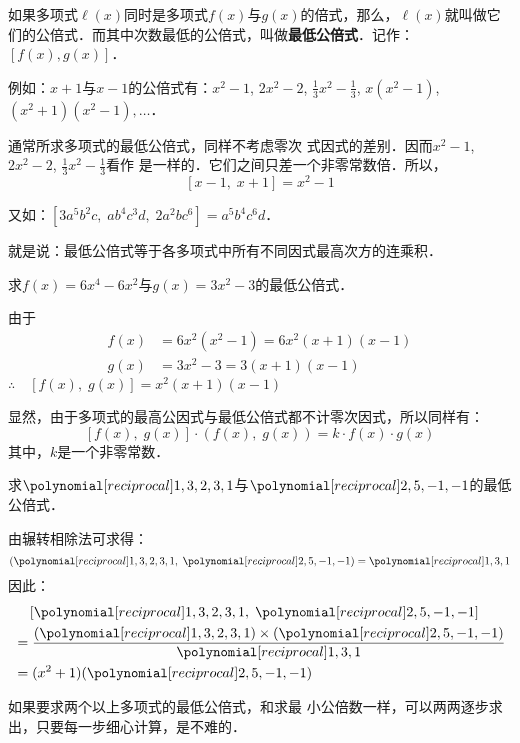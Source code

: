如果多项式$\ell(x)$同时是多项式$f(x)$与$g(x)$的倍式，那么，$\ell(x)$就叫做它们的公倍式．而其中次数最低的公倍式，叫做\textbf{最低公倍式}．记作：$[f(x),g(x)]$．

例如：$x+1$与$x-1$的公倍式有：$x^2-1$, $2x^2-2$, $\frac{1}{3}x^2-\frac{1}{3}$, $x (x^2-1)$, $(x^2+1)(x^2-1),\ldots$．

通常所求多项式的最低公倍式，同样不考虑零次
式因式的差别．因而$x^2-1$, $2x^2-2$, $\frac{1}{3}x^2-\frac{1}{3}$看作
是一样的．它们之间只差一个非零常数倍．所以，
\[[x-1,\; x+1]=x^2-1\]

又如：$[3a^5b^2c,\; ab^4c^3d,\; 2a^2bc^6]=a^5b^4c^6d$．

就是说：最低公倍式等于各多项式中所有不同因式最高次方的连乘积．

\begin{example}
求$f(x)=6x^4-6x^2$与$g(x)=3x^2-3$的最低公倍式．
\end{example}

\begin{solution}
由于
\[\begin{split}
    f(x)&=6x^2(x^2-1)=6x^2(x+1)(x-1)\\
    g(x)&=3x^2-3=3(x+1)(x-1)
\end{split}\]
$\therefore\quad [f(x),\; g(x)]=x^2(x+1)(x-1)$
\end{solution}

显然，由于多项式的最高公因式与最低公倍式都不计零次因式，所以同样有：
\[[f (x) ,\; g (x) ] \cdot  (f (x) ,\; g (x) ) =k\cdot f (x) \cdot g (x) \]
其中，$k$是一个非零常数．

\begin{example}
求$\poly{1,3,2,3,1}$与$\poly{2,5,-1,-1}$的最低公倍式．
\end{example}

\begin{solution}
由辗转相除法可求得：
\[\left(\poly{1,3,2,3,1}, \; \poly{2,5,-1,-1}\right)=\poly{1,3,1}\]
因此：
\[\begin{split}
    &\quad \left[\poly{1,3,2,3,1}, \; \poly{2,5,-1,-1}\right]\\
    &=\frac{(\poly{1,3,2,3,1})\x (\poly{2,5,-1,-1})}{\poly{1,3,1}}\\
    &=(x^2+1)(\poly{2,5,-1,-1})
\end{split}\]

如果要求两个以上多项式的最低公倍式，和求最
小公倍数一样，可以两两逐步求出，只要每一步细心计算，是不难的．
\end{solution}




